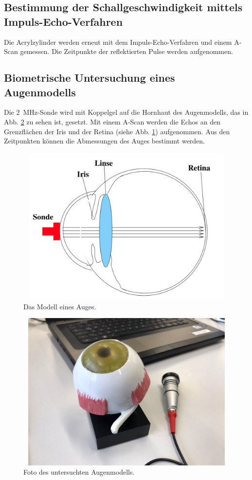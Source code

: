 \subsection{Bestimmung der Schallgeschwindigkeit mittels Impuls-Echo-Verfahren}
Die Acrylzylinder werden erneut mit dem Impuls-Echo-Verfahren
und einem A-Scan gemessen. Die Zeitpunkte der reflektierten Pulse
werden aufgenommen.

\subsection{Biometrische Untersuchung eines Augenmodells}
Die \SI{2}{\mega\hertz}-Sonde wird mit Koppelgel auf die
Hornhaut des Augenmodells, das in Abb. \ref{fig:bild_augenmodell} zu sehen ist, gesetzt. Mit einem A-Scan werden die
Echos an den Grenzflächen der Iris und der Retina (siehe Abb. \ref{fig:augenmodell}) aufgenommen.
Aus den Zeitpunkten können die Abmessungen des Auges bestimmt 
werden.
\begin{figure}
    \centering
    \includegraphics[width=12cm, height=8cm]{build/Augenmodell.png}
    \caption{Das Modell eines Auges. \cite{CS1}}
    \label{fig:augenmodell}
\end{figure}
\begin{figure}
    \centering
    \includegraphics[width=12cm, height=8cm]{build/BildAuge.jpg}
    \caption{Foto des untersuchten Augenmodells.}
    \label{fig:bild_augenmodell}
\end{figure}